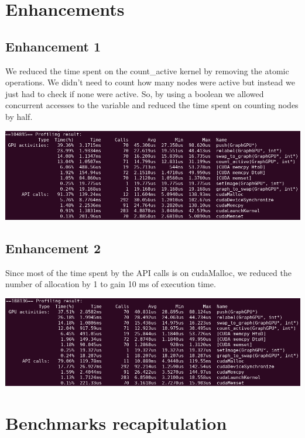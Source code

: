 \documentclass{article}
\begin{document}
\section{Enhancements}

\subsection{Enhancement 1}
We reduced the time spent on the count\_active kernel by removing the atomic operations. We didn't need to count how many nodes were active but instead we just had to check if none were active. So, by using a boolean we allowed concurrent accesses to the variable and reduced the time spent on counting nodes by half.

\begin{center}
\includegraphics[scale=0.5]{pics/gpu_prof2_cut.png}
\end{center}
\newpage

\subsection{Enhancement 2}
Since most of the time spent by the API calls is on cudaMalloc, we reduced the number of allocation by 1 to gain 10 ms of execution time.

\begin{center}
\includegraphics[scale=0.5]{pics/gpu_prof3_cut.png}
\end{center}

\section{Benchmarks recapitulation}
\end{document}
